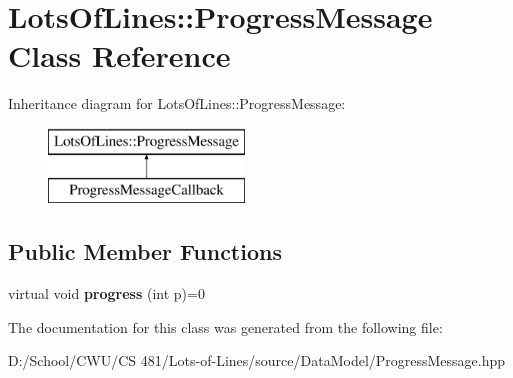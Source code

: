 \hypertarget{class_lots_of_lines_1_1_progress_message}{}\section{Lots\+Of\+Lines\+:\+:Progress\+Message Class Reference}
\label{class_lots_of_lines_1_1_progress_message}
Inheritance diagram for Lots\+Of\+Lines\+:\+:Progress\+Message\+:\begin{figure}[H]
\begin{center}
\leavevmode
\includegraphics[height=2.000000cm]{class_lots_of_lines_1_1_progress_message}
\end{center}
\end{figure}
\subsection*{Public Member Functions}
\begin{DoxyCompactItemize}
\item 
virtual void {\bfseries progress} (int p)=0\hypertarget{class_lots_of_lines_1_1_progress_message_a216b524c5e4680dea556a68547daab5d}{}\label{class_lots_of_lines_1_1_progress_message_a216b524c5e4680dea556a68547daab5d}

\end{DoxyCompactItemize}


The documentation for this class was generated from the following file\+:\begin{DoxyCompactItemize}
\item 
D\+:/\+School/\+C\+W\+U/\+C\+S 481/\+Lots-\/of-\/\+Lines/source/\+Data\+Model/Progress\+Message.\+hpp\end{DoxyCompactItemize}
